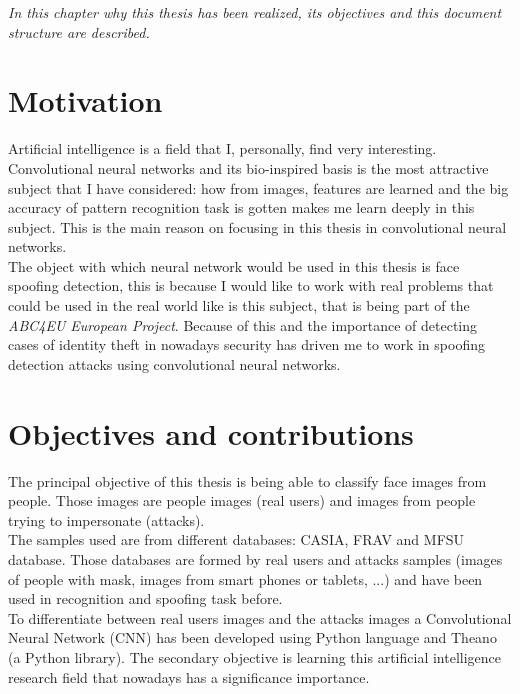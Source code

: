 \minitoc
\mtcskip

\begin{small}
\emph{In this chapter why this thesis has been realized, its objectives and this document structure are described.\\}
\end{small}
\section{Motivation}
Artificial intelligence is a field that I, personally, find very interesting. Convolutional neural networks and its bio-inspired basis is the most attractive subject that I have considered: how from images, features are learned and the big accuracy of pattern recognition task is gotten makes me learn deeply in this subject. This is the main reason on focusing in this thesis in convolutional neural networks.\\

The object with which neural network would be used in this thesis is face spoofing detection, this is because I would like to work with real problems that could be used in the real world like is this subject, that is being part of the \textit{ABC4EU European Project}. Because of this and the importance of detecting cases of identity theft in nowadays security has driven me to work in spoofing detection attacks using convolutional neural networks.

\section{Objectives and contributions}
The principal objective of this thesis is being able to classify face images from people. Those images are people images (real users) and images from people trying to impersonate (attacks).\\

The samples used are from different databases: CASIA, FRAV and MFSU database. Those databases are formed by real users and attacks samples (images of people with mask, images from smart phones or tablets, ...) and have been used in recognition and spoofing task before.\\

To differentiate between real users images and the attacks images a Convolutional Neural Network (CNN) has been developed using Python language and Theano (a Python library). The secondary objective is learning this artificial intelligence research field that nowadays has a significance importance.\\

